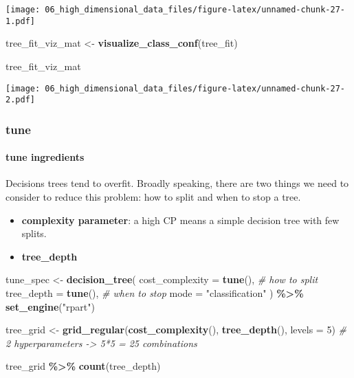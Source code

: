 \documentclass[
]{book}
\newenvironment{Shaded}{\begin{snugshade}}{\end{snugshade}}
\newcommand{\CommentTok}[1]{\textcolor[rgb]{0.56,0.35,0.01}{\textit{#1}}}
\newcommand{\DataTypeTok}[1]{\textcolor[rgb]{0.13,0.29,0.53}{#1}}
\newcommand{\DecValTok}[1]{\textcolor[rgb]{0.00,0.00,0.81}{#1}}
\newcommand{\KeywordTok}[1]{\textcolor[rgb]{0.13,0.29,0.53}{\textbf{#1}}}
\newcommand{\NormalTok}[1]{#1}
\newcommand{\OperatorTok}[1]{\textcolor[rgb]{0.81,0.36,0.00}{\textbf{#1}}}
\newcommand{\StringTok}[1]{\textcolor[rgb]{0.31,0.60,0.02}{#1}}
\begin{document}
\texttt{[image: 06\_high\_dimensional\_data\_files/figure-latex/unnamed-chunk-27-1.pdf]}

\begin{Shaded}
\begin{Highlighting}[]
\NormalTok{tree\_fit\_viz\_mat \textless{}{-}}\StringTok{ }\KeywordTok{visualize\_class\_conf}\NormalTok{(tree\_fit)}

\NormalTok{tree\_fit\_viz\_mat}
\end{Highlighting}
\end{Shaded}

\texttt{[image: 06\_high\_dimensional\_data\_files/figure-latex/unnamed-chunk-27-2.pdf]}

\hypertarget{tune-1}{%
\subsubsection{tune}\label{tune-1}}

\hypertarget{tune-ingredients-1}{%
\paragraph{tune ingredients}\label{tune-ingredients-1}}

Decisions trees tend to overfit. Broadly speaking, there are two things we need to consider to reduce this problem: how to split and when to stop a tree.

\begin{itemize}
\item
  \textbf{complexity parameter}: a high CP means a simple decision tree with few splits.
\item
  \textbf{tree\_depth}
\end{itemize}

\begin{Shaded}
\begin{Highlighting}[]
\NormalTok{tune\_spec \textless{}{-}}\StringTok{ }
\StringTok{  }\KeywordTok{decision\_tree}\NormalTok{(}
    \DataTypeTok{cost\_complexity =} \KeywordTok{tune}\NormalTok{(), }\CommentTok{\# how to split }
    \DataTypeTok{tree\_depth =} \KeywordTok{tune}\NormalTok{(), }\CommentTok{\# when to stop }
    \DataTypeTok{mode =} \StringTok{"classification"}
\NormalTok{  ) }\OperatorTok{\%\textgreater{}\%}
\StringTok{  }\KeywordTok{set\_engine}\NormalTok{(}\StringTok{"rpart"}\NormalTok{)}

\NormalTok{tree\_grid \textless{}{-}}\StringTok{ }\KeywordTok{grid\_regular}\NormalTok{(}\KeywordTok{cost\_complexity}\NormalTok{(),}
                          \KeywordTok{tree\_depth}\NormalTok{(),}
                          \DataTypeTok{levels =} \DecValTok{5}\NormalTok{) }\CommentTok{\# 2 hyperparameters {-}\textgreater{} 5*5 = 25 combinations }

\NormalTok{tree\_grid }\OperatorTok{\%\textgreater{}\%}
\StringTok{  }\KeywordTok{count}\NormalTok{(tree\_depth)}
\end{Highlighting}
\end{Shaded}
\end{document}
